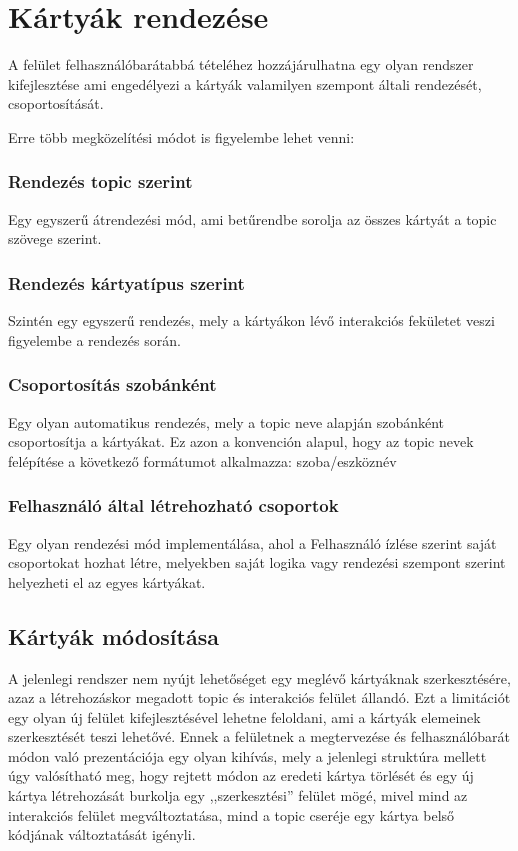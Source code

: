 \documentclass[]{thesis-ekf}
\theoremstyle{definition}
\theoremstyle{remark}
\begin{document}
\section{Kártyák rendezése}
A felület felhasználóbarátabbá tételéhez hozzájárulhatna egy olyan rendszer kifejlesztése ami engedélyezi a
kártyák valamilyen szempont általi rendezését, csoportosítását.

Erre több megközelítési módot is figyelembe lehet venni:

\subsubsection{Rendezés topic szerint}
Egy egyszerű átrendezési mód, ami betűrendbe sorolja az összes kártyát a topic szövege szerint.

\subsubsection{Rendezés kártyatípus szerint}
Szintén egy egyszerű rendezés, mely a kártyákon lévő interakciós fekületet veszi figyelembe a rendezés során.

\subsubsection{Csoportosítás szobánként}
Egy olyan automatikus rendezés, mely a topic neve alapján szobánként csoportosítja a kártyákat.
Ez azon a konvención alapul, hogy az topic nevek felépítése a következő formátumot alkalmazza: szoba/eszköznév

\subsubsection{Felhasználó által létrehozható csoportok}
Egy olyan rendezési mód implementálása, ahol a Felhasználó ízlése szerint saját csoportokat hozhat létre, 
melyekben saját logika vagy rendezési szempont szerint helyezheti el az egyes kártyákat.

\subsection{Kártyák módosítása}
A jelenlegi rendszer nem nyújt lehetőséget egy meglévő kártyáknak szerkesztésére, azaz a létrehozáskor megadott
topic és interakciós felület állandó. Ezt a limitációt egy olyan új felület kifejlesztésével
lehetne feloldani, ami a kártyák elemeinek szerkesztését teszi lehetővé. Ennek a felületnek a megtervezése
és felhasználóbarát módon való prezentációja egy olyan kihívás, mely a jelenlegi struktúra mellett
úgy valósítható meg, hogy rejtett módon az eredeti kártya törlését és egy új kártya létrehozását burkolja
egy ,,szerkesztési'' felület mögé, mivel mind az interakciós felület megváltoztatása, mind a topic cseréje
egy kártya belső kódjának változtatását igényli.
\end{document}
